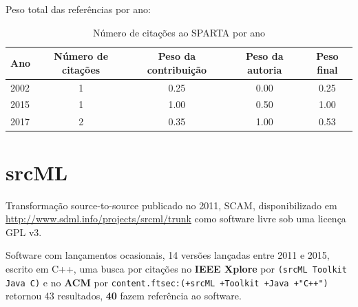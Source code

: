 Peso total das referências por ano:

\begin{table}[h]
\caption{Número de citações ao SPARTA  por ano}
\centering
\begin{tabular}{| l | c | c | c | c |}
  \hline
  Ano & Número de citações & Peso da contribuição & Peso da autoria & Peso final \\
  \hline
  2002
    & 1
    & 0.25
    & 0.00
    & 0.25 \\
  2015
    & 1
    & 1.00
    & 0.50
    & 1.00 \\
  2017
    & 2
    & 0.35
    & 1.00
    & 0.53 \\
  \hline
\end{tabular}
\end{table}


\section{srcML}

Transformação source-to-source
publicado no 2011, SCAM,
disponibilizado em \url{http://www.sdml.info/projects/srcml/trunk}
como software livre
sob uma licença GPL v3.

Software com lançamentos ocasionais,
14 versões lançadas
entre 2011 e 2015,
escrito em C++,
uma busca por citações no {\bf IEEE Xplore} por
\texttt{(srcML Toolkit Java C)}
e no {\bf ACM} por
\texttt{content.ftsec:(+srcML +Toolkit +Java +"C++")}
retornou
43 resultados,
{\bf 40} fazem referência ao software.

